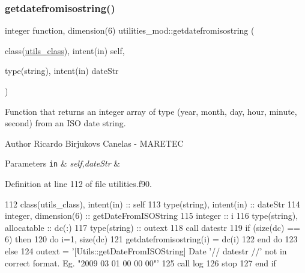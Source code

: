 \subsubsection{\texorpdfstring{getdatefromisostring()}{getdatefromisostring()}}
{\footnotesize\ttfamily integer function, dimension(6) utilities\+\_\+mod\+::getdatefromisostring (\begin{DoxyParamCaption}\item[{class(\mbox{\hyperlink{structutilities__mod_1_1utils__class}{utils\+\_\+class}}), intent(in)}]{self,  }\item[{type(string), intent(in)}]{date\+Str }\end{DoxyParamCaption})\hspace{0.3cm}{\ttfamily [private]}}



Function that returns an integer array of type (year, month, day, hour, minute, second) from an I\+SO date string. 

\begin{DoxyAuthor}{Author}
Ricardo Birjukovs Canelas -\/ M\+A\+R\+E\+T\+EC 
\end{DoxyAuthor}

\begin{DoxyParams}[1]{Parameters}
\mbox{\tt in}  & {\em self,date\+Str} & \\
\hline
\end{DoxyParams}


Definition at line 112 of file utilities.\+f90.


\begin{DoxyCode}
112     \textcolor{keywordtype}{class}(utils\_class), \textcolor{keywordtype}{intent(in)} :: self
113     \textcolor{keywordtype}{type}(string), \textcolor{keywordtype}{intent(in)} :: dateStr
114     \textcolor{keywordtype}{integer}, \textcolor{keywordtype}{dimension(6)} :: getDateFromISOString
115     \textcolor{keywordtype}{integer} :: i
116     \textcolor{keywordtype}{type}(string), \textcolor{keywordtype}{allocatable} :: dc(:)
117     \textcolor{keywordtype}{type}(string) :: outext
118     \textcolor{keyword}{call }datestr%
119     \textcolor{keywordflow}{if} (\textcolor{keyword}{size}(dc) == 6) \textcolor{keywordflow}{then}
120         \textcolor{keywordflow}{do} i=1, \textcolor{keyword}{size}(dc)
121             getdatefromisostring(i) = dc(i)%
122 \textcolor{keywordflow}{        end do}
123     \textcolor{keywordflow}{else}
124         outext = \textcolor{stringliteral}{'[Utils::getDateFromISOString] Date '}// datestr //\textcolor{stringliteral}{' not in correct format. Eg. "2009 03 01
       00 00 00"'}
125         \textcolor{keyword}{call }log%
126         stop
127 \textcolor{keywordflow}{    end if}
\end{DoxyCode}
\mbox{\label{namespaceutilities__mod_a83ed7b458b5b642544fd59ce7473eb0c}} 
